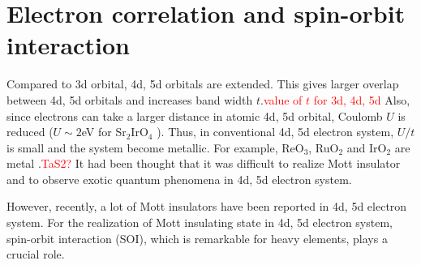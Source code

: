 \section{Electron correlation and spin-orbit interaction}
\label{corr_and_SOI}
Compared to 3d orbital, 4d, 5d orbitals are extended.
This gives larger overlap between 4d, 5d orbitals and increases band width $t$.\textcolor{red}{value of $t$ for 3d, 4d, 5d}
Also, since electrons can take a larger distance in atomic 4d, 5d orbital, Coulomb $U$ is reduced ($U \sim 2$eV for Sr$_2$IrO$_4$ \cite{arita2012ab}).
Thus, in conventional 4d, 5d electron system, $U/t$ is small and the system become metallic.
For example, ReO$_3$, RuO$_2$ and IrO$_2$ are metal \cite{}.\textcolor{red}{TaS2?}
It had been thought that it was difficult to realize Mott insulator and to observe exotic quantum phenomena in 4d, 5d electron system.

However, recently, a lot of Mott insulators have been reported in 4d, 5d electron system.
For the realization of Mott insulating state in 4d, 5d electron system, spin-orbit interaction (SOI), which is remarkable for heavy elements, plays a crucial role.

